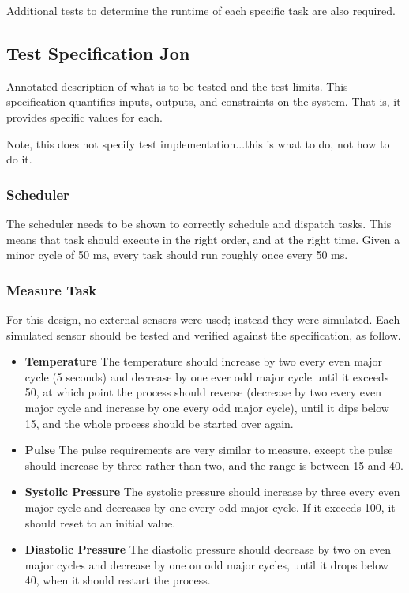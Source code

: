 \documentclass[12pt]{article} %
\begin{document}
Additional tests to determine the runtime of each specific task are also required.

\subsection{Test Specification Jon}

Annotated description of what is to be tested and the test limits.  This specification quantifies inputs, outputs, and constraints on the system.  That is, it provides specific values for each. 

Note, this does not specify test implementation...this is what to do, not how to do it.

\subsubsection{Scheduler}
The scheduler needs to be shown to correctly schedule and dispatch tasks.  This means that task should execute in the right order, and at the right time.  Given a minor cycle of 50 ms, every task should run roughly once every 50 ms.  

\subsubsection{Measure Task}
For this design, no external sensors were used; instead they were simulated.  Each simulated sensor should be tested and verified against the specification, as follow.
\begin{itemize}
  \item \textbf{Temperature} The temperature should increase by two every even major cycle (5 seconds) and decrease by one ever odd major cycle until it exceeds 50, at which point the process should reverse (decrease by two every even major cycle and increase by one every odd major cycle), until it dips below 15, and the whole process should be started over again.  
  \item \textbf{Pulse} The pulse requirements are very similar to measure, except the pulse should increase by three rather than two, and the range is between 15 and 40.
  \item \textbf{Systolic Pressure} The systolic pressure should increase by three every even major cycle and decreases by one every odd major cycle.  If it exceeds 100, it should reset to an initial value.
  \item \textbf{Diastolic Pressure} The diastolic pressure should decrease by two on even major cycles and decrease by one on odd major cycles, until it drops below 40, when it should restart the process.
\end{itemize}
\end{document}
